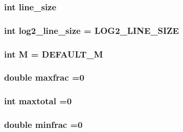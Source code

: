 \subsubsection[{line\+\_\+size}]{\setlength{\rightskip}{0pt plus 5cm}int line\+\_\+size}\label{fft_8C_a43a1d2286bbb11edc0c83ec8588dd81d}
\hypertarget{fft_8C_afdcaa2ef4ede55618f5ff6d5aa53dac6}{}
\subsubsection[{log2\+\_\+line\+\_\+size}]{\setlength{\rightskip}{0pt plus 5cm}int log2\+\_\+line\+\_\+size = {\bf L\+O\+G2\+\_\+\+L\+I\+N\+E\+\_\+\+S\+I\+Z\+E}}\label{fft_8C_afdcaa2ef4ede55618f5ff6d5aa53dac6}
\hypertarget{fft_8C_a5e78dbd5fd0fc01ba7b98dd15e27221e}{}
\subsubsection[{M}]{\setlength{\rightskip}{0pt plus 5cm}int M = {\bf D\+E\+F\+A\+U\+L\+T\+\_\+\+M}}\label{fft_8C_a5e78dbd5fd0fc01ba7b98dd15e27221e}
\hypertarget{fft_8C_acff78ed4dd1ec7c0054655fe1ff24e86}{}
\subsubsection[{maxfrac}]{\setlength{\rightskip}{0pt plus 5cm}double maxfrac =0}\label{fft_8C_acff78ed4dd1ec7c0054655fe1ff24e86}
\hypertarget{fft_8C_abaacc1b51e77ad76d3bd569c6a761b50}{}
\subsubsection[{maxtotal}]{\setlength{\rightskip}{0pt plus 5cm}int maxtotal =0}\label{fft_8C_abaacc1b51e77ad76d3bd569c6a761b50}
\hypertarget{fft_8C_adae7fdc068d0cda31e7c82201018d2cb}{}
\subsubsection[{minfrac}]{\setlength{\rightskip}{0pt plus 5cm}double minfrac =0}\label{fft_8C_adae7fdc068d0cda31e7c82201018d2cb}
\hypertarget{fft_8C_ae4ea09b43e337f76159fd601ec785bcf}{}
